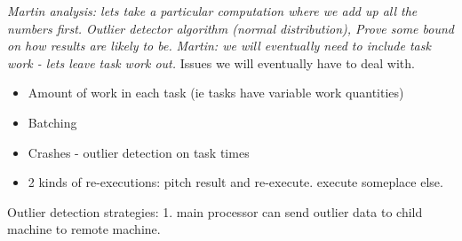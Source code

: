 \documentclass[11pt, oneside]{article}   	%
\begin{document}
\textit{Martin analysis: lets take a particular computation where we add up all the numbers first. Outlier detector algorithm (normal distribution), Prove some bound on how results are likely to be.} 
\textit{Martin: we will eventually need to include task work - lets leave task work out.}
Issues we will eventually have to deal with.
\begin{itemize}
	\item Amount of work in each task (ie tasks have variable work quantities)
	\item Batching 
	\item Crashes - outlier detection on task times
	\item 2 kinds of re-executions: pitch result and re-execute. execute someplace else.
\end{itemize}
Outlier detection strategies:
1. main processor can send outlier data to child machine to remote machine.
\end{document}
